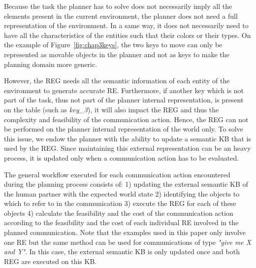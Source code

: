 \documentclass[a4paper,11pt,twoside]{StyleThese}
\begin{document}
Because the task the planner has to solve does not necessarily imply all the elements present in the current environment, the planner does not need a full representation of the environment. In a same way, it does not necessarily need to have all the characteristics of the entities such that their colors or their types. On the example of Figure~\ref{fig:chap3keys}, the two keys to move can only be represented as movable objects in the planner and not as keys to make the planning domain more generic. 

However, the REG needs all the semantic information of each entity of the environment to generate accurate RE. Furthermore, if another key which is not part of the task, thus not part of the planner internal representation, is present on the table (such as \textit{key\_3}), it will also impact the REG and thus the complexity and feasibility of the communication action. 
Hence, the REG can not be performed on the planner internal representation of the world only.
To solve this issue, we endow the planner with the ability to update a semantic KB that is used by the REG. Since maintaining this external representation can be an heavy process, it is updated only when a communication action has to be evaluated.

The general workflow executed for each communication action encountered during the planning process consists of: 1) updating the external semantic KB of the human partner with the expected world state 2) identifying the objects to which to refer to in the communication 3) execute the REG for each of these objects 4) calculate the feasibility and the cost of the communication action according to the feasibility and the cost of each individual RE involved in the planned communication. Note that the examples used in this paper only involve one RE but the same method can be used for communications of type \textit{"give me X and Y"}. In this case, the external semantic KB is only updated once and both REG are executed on this KB.

\end{document}
